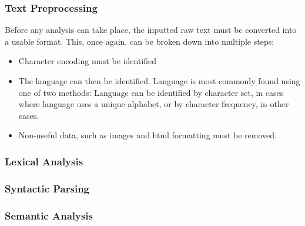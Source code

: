 \documentclass[twocolumn]{article}
\begin{document}
\subsubsection{Text Preprocessing}
\label{sec:TextPreprocessing}
Before any analysis can take place, the inputted raw text must be converted into a usable format. This, once again, can be broken down into multiple steps\cite{NLPHandbook}: 
\begin{itemize}
	\item Character encoding must be identified
	\item The language can then be identified. Language is most commonly found using one of two methods: Language can be identified by character set, in cases where language uses a unique alphabet, or by character frequency, in other cases.
	\item Non-useful data, such as images and html formatting must be removed.
\end{itemize}

\subsubsection{Lexical Analysis}
\label{sec:LexicalAnalysis}


\subsubsection{Syntactic Parsing}
\label{sec:SyntacticParsing}


\subsubsection{Semantic Analysis}
\label{sec:SemanticAnalysis}




\end{document}
